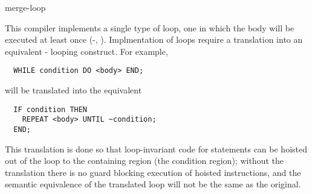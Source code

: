 \begin{instruction}{merge-loop}

  \begin{notes}
    This compiler implements a single type of loop, one in which the
    body will be executed at least once (-,
    ).  Implmentation of  loops require a
    translation into an equivalent - looping
    construct.  For example,

\begin{verbatim}
  WHILE condition DO <body> END;
\end{verbatim}

    will be translated into the equivalent

\begin{verbatim}
  IF condition THEN
    REPEAT <body> UNTIL ~condition;
  END;
\end{verbatim}

    This translation is done so that loop-invariant code for
     statements can be hoisted out of the loop to the
    containing region (the  condition region); without the
    translation there is no guard blocking execution of hoisted
    instructions, and the semantic equivalence of the translated loop
    will not be the same as the original.
  \end{notes}

  \nresults

  \begin{operands}
  \item {}
  \item {}
  \end{operands}
\end{instruction}

